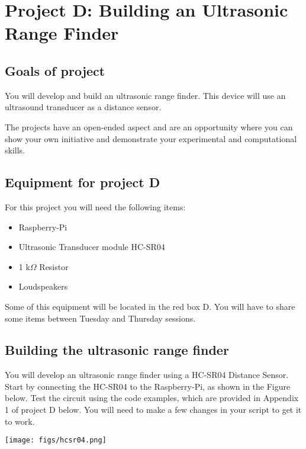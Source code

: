  
 \newpage
\section{Project D: Building an Ultrasonic Range Finder}

\subsection{Goals of project}

You will develop and build an ultrasonic range finder. This device will use an ultrasound transducer as a distance sensor. 

The projects have an open-ended aspect and are an opportunity where you can show your own initiative and demonstrate your experimental and computational skills. 

\subsection{Equipment for project D}

For this project you will need the following items:
\begin{itemize}
\item Raspberry-Pi
\item Ultrasonic Transducer module HC-SR04
\item 1 k$\Omega$ Resistor
\item Loudspeakers
\end{itemize}
Some of this equipment will be located in the red box D. You will have to share some items between Tuesday and Thursday sessions. 


\subsection{Building the ultrasonic range finder}
 
You will develop an ultrasonic range finder using a HC-SR04 Distance Sensor. 
Start by connecting the HC-SR04 to the Raspberry-Pi, as shown in the Figure below. Test the circuit using the code examples, which are provided in Appendix 1 of project D below. 
You will need to make a few changes in your script  to get it to work.

\begin{center}                                        
 {\texttt{[image: figs/hcsr04.png]}}
 \end{center}


